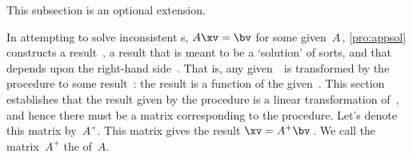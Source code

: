 
\begin{comment}
Could save 10 pages or so if omitted??
\end{comment}

This subsection is an optional extension.

In attempting to solve inconsistent s, 
\(A\xv=\bv\) for some given~\(A\)\,, \cref{pro:appsol} constructs a result~\xv, a result that is meant to be a `solution' of sorts, and that depends upon the right-hand side~\bv.
That is, any given~\bv\ is transformed by the procedure to some result~\xv: the result is a function of the given~\bv.
This section establishes that the result given by the procedure is a linear transformation of~\bv, and hence there must be a matrix corresponding to the procedure. 
Let's denote this matrix by~\(A^+\).
This matrix gives the result \(\xv=A^+\bv\)\,.
We call the matrix~\(A^+\) the  of~\(A\).

